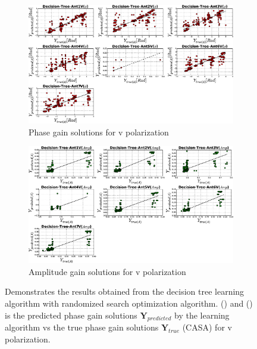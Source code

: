 \begin{figure}[H]
   \centering
    \begin{subfigure}[t]{0.52\textheight}
        
        \includegraphics[width=\textwidth]{images/Decision-TreeVphase.eps} 
        \caption{Phase gain solutions for v polarization}
         \label{A1}
    \end{subfigure}
    
      \begin{subfigure}[t]{0.52\textheight}
       
        \includegraphics[width=\textwidth]{images/Decision-TreeVamp.eps} 
        \caption{Amplitude gain solutions for v polarization} 
        \label{B1}
    \end{subfigure}
    \caption{Demonstrates the results obtained from the decision tree learning algorithm with randomized search optimization algorithm. () and () is the predicted phase gain solutions $\textbf{Y}_{predicted}$ by the learning algorithm vs the true phase gain solutions $\textbf{Y}_{true}$ (CASA) for v polarization.}
    \end{figure}
    
